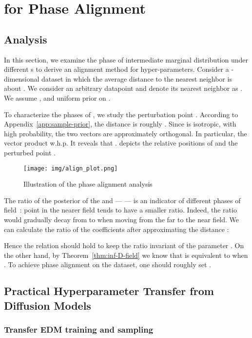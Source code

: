 \section{ for Phase Alignment}
\subsection{Analysis}
\label{app:phase-align}



In this section, we examine the phase of intermediate marginal distribution  under different s to derive an alignment method for hyper-parameters. Consider a -dimensional dataset  in which the average distance to the nearest neighbor is about . We consider an arbitrary datapoint  and denote its nearest neighbor as . We assume , and uniform prior on .


To characterize the phases of , we study the perturbation point . According to Appendix~\ref{app:sample-prior}, the distance  is roughly . Since  is isotropic, with high probability, the two vectors  are approximately orthogonal. In particular, the vector product  w.h.p. It reveals that .  depicts the relative positions of  and the perturbed point .

\begin{figure*}[t]
\centering    \texttt{[image: img/align\_plot.png]}
    \caption{Illustration of the phase alignment analysis}
    \label{fig:align-analysis}
\end{figure*}

The ratio of the posterior of the  and   ---  ---  is an indicator of different phases of field~\cite{Xu2023StableTF}: point in the nearer field tends to have a smaller ratio. Indeed, the ratio would gradually decay from  to  when moving from the far to the near field.  We can calculate the ratio of the coefficients after approximating the distance :


Hence the relation  should hold to keep the ratio invariant of the parameter . On the other hand, by Theorem~\ref{thm:inf-D-field} we know that  is equivalent to  when . To achieve phase alignment on the dataset, one should roughly set .

\subsection{Practical Hyperparameter Transfer from Diffusion Models}
\label{app:transfer-diff}

\subsubsection{Transfer EDM training and sampling}


